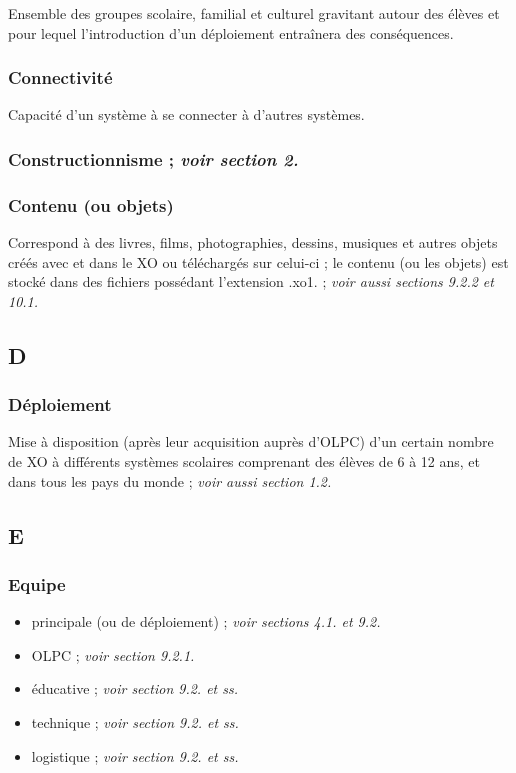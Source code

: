\documentclass[12pt]{article}
\begin{document}
Ensemble des groupes scolaire, familial et culturel gravitant autour des
élèves et pour lequel l'introduction d'un déploiement entraînera des
conséquences.
\subsubsection{Connectivité}
\label{sec-14-3-8}


Capacité d'un système à se connecter à d'autres systèmes.
\subsubsection{Constructionnisme ; \emph{voir section 2.}}
\label{sec-14-3-9}
\subsubsection{Contenu (ou objets)}
\label{sec-14-3-10}


Correspond à des livres, films, photographies, dessins, musiques et autres
objets créés avec et dans le XO ou téléchargés sur celui-ci ; le contenu
(ou les objets) est stocké dans des fichiers possédant l'extension .xo1. ;
\emph{voir aussi sections 9.2.2 et 10.1.}
\subsection{D}
\label{sec-14-4}
\subsubsection{Déploiement}
\label{sec-14-4-1}


Mise à disposition (après leur acquisition auprès d'OLPC) d'un certain
nombre de XO à différents systèmes scolaires comprenant des élèves de 6 à
12 ans, et dans tous les pays du monde ; \emph{voir aussi section 1.2.}
\subsection{E}
\label{sec-14-5}
\subsubsection{Equipe}
\label{sec-14-5-1}


\begin{itemize}
\item principale (ou de déploiement) ; \emph{voir sections 4.1. et 9.2.}
\item OLPC ; \emph{voir section 9.2.1.}
\item éducative ; \emph{voir section 9.2. et ss.}
\item technique ; \emph{voir section 9.2. et ss.}
\item logistique ; \emph{voir section 9.2. et ss.}
\end{itemize}
\end{document}
